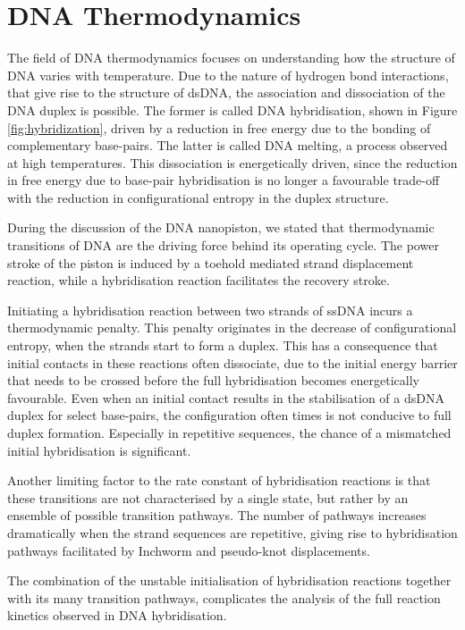 \section{DNA Thermodynamics}

 The field of DNA thermodynamics focuses on understanding how the structure of DNA varies
with temperature. Due to the nature of hydrogen bond interactions, that give rise to the
structure of dsDNA, the association and dissociation of the DNA duplex is possible. The
former is called DNA hybridisation, shown in Figure \ref{fig:hybridization}, driven by a
reduction in free
energy due to the bonding of complementary base-pairs. The latter is called DNA
melting, a process observed at high temperatures. This dissociation is
energetically driven, since the reduction in free energy due to base-pair hybridisation
is no longer a favourable trade-off with the reduction in configurational entropy in the
duplex structure.

During the discussion of the DNA nanopiston, we stated that thermodynamic transitions of
DNA are the driving force behind its operating cycle. The power stroke of the piston is
induced by a toehold mediated strand displacement reaction, while a hybridisation
reaction facilitates the recovery stroke.

Initiating a hybridisation reaction between two strands of ssDNA incurs a thermodynamic
penalty. This penalty originates in the decrease of configurational entropy, when the
strands start to form a duplex. This has a consequence that initial contacts in these
reactions often dissociate, due to the initial energy barrier that needs to be crossed
before the full hybridisation becomes energetically favourable. Even when an initial
contact
results in the stabilisation of a dsDNA duplex for select base-pairs, the configuration
often times is not conducive to full duplex formation. Especially in repetitive
sequences, the chance of a mismatched initial hybridisation is significant.

Another limiting factor to the rate constant of hybridisation reactions is that these
transitions are not characterised by a single state, but rather by an ensemble of
possible transition pathways. The number of pathways increases dramatically when the
strand sequences are repetitive, giving rise to hybridisation pathways facilitated by
Inchworm and pseudo-knot displacements\cite{Ouldridge2013}.

The combination of the unstable initialisation of hybridisation reactions together
with its many transition pathways, complicates the analysis of the full reaction kinetics
observed in DNA hybridisation.


